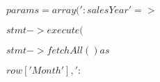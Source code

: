 \documentclass[10pt]{book}
\begin{document}
\begin{mdSnippets}
\begin{mdInlineSnippet}[b01e11299903916a7a0b612a6ab2c6d5]%
$params = array(':salesYear' => $\end{mdInlineSnippet}%
\begin{mdInlineSnippet}[979a580bb2ec774992afc0849808754b]%
$stmt->execute($\end{mdInlineSnippet}%
\begin{mdInlineSnippet}[0374344e11172bbef44fb7c4b6e1d04f]%
$stmt->fetchAll() as $\end{mdInlineSnippet}%
\begin{mdInlineSnippet}%
$row['Month'], ' : $\end{mdInlineSnippet}%

\end{mdSnippets}
\end{document}

